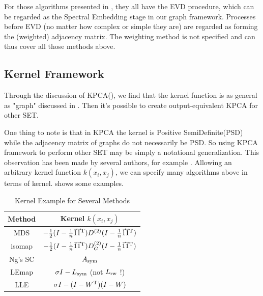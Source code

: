 For those algorithms presented in \rsec{\ref{sec:nldr}}, 
they all have the EVD procedure, which can be regarded as 
the Spectral Embedding stage in our graph framework. 
Processes before EVD (no matter how complex or simple they are) 
are regarded as forming the (weighted) adjacency matrix. 
The weighting method is not specified and can thus cover
all those methods above. 

\subsection{Kernel Framework}
\label{sec:kfx}

Through the discussion of KPCA(\rsec{\ref{sec:kpca}}), 
we find that the kernel function is as general as "graph" 
discussed in \rsec{\ref{sec:gfx}}. Then it's possible  
to create output-equivalent KPCA for other SET. 

One thing to note is that in KPCA the kernel is Positive 
SemiDefinite(PSD) while the adjacency matrix of graphs
do not necessarily be PSD. So using KPCA framework to 
perform other SET may be simply a notational generalization. 
This observation has been made by several authors, for example
\cite{bengio2004learning}\cite{bengio2006spectral}\cite{ham2004kernel}. 
Allowing an arbitrary kernel function $ k(x_i,x_j) $, 
we can specify many algorithms above in terms of kernel. 
\rtbl{\ref{tbl:kernel}} shows some examples. 

\begin{table}[htb]
	\centering
	\caption{Kernel Example for Several Methods}
	\label{tbl:kernel}
	\begin{tabular}{c|c}
		\hline 
		Method & Kernel $ k(x_i,x_j) $ \\
		\hline 
		MDS\cite{borg2005modern} 
		& $ -\frac{1}{2}(I - \frac{1}{n} \vec{1} \vec{1}^\mathrm{T})
		D^{(2)} (I - \frac{1}{n} \vec{1} \vec{1}^\mathrm{T}) $ \\
		isomap\cite{tenenbaum2000isomap} 
		& $ -\frac{1}{2}(I - \frac{1}{n} \vec{1} \vec{1}^\mathrm{T})
		D_G^{(2)} (I - \frac{1}{n} \vec{1} \vec{1}^\mathrm{T}) $ \\
		Ng's SC\cite{ng2002spectral} & $ A_{\text{sym}} $ \\
		LEmap\cite{belkin2003laplacian} & $ \sigma I - L_{\text{sym}} $ (not $ L_{\text{rw}}$ !)\\ 
		LLE\cite{roweis2000lle} & $ \sigma I - (I - W^\mathrm{T})(I - W) $ \\
		\hline 
	\end{tabular}
\end{table} 

